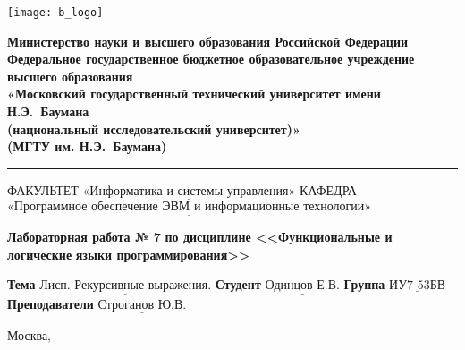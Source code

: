 \thispagestyle{empty}

\noindent \begin{minipage}{0.15\textwidth}
	\texttt{[image: b\_logo]}
\end{minipage}
\noindent\begin{minipage}{0.85\textwidth}\centering
	\textbf{Министерство науки и высшего образования Российской Федерации}\\
	\textbf{Федеральное государственное бюджетное образовательное учреждение высшего образования}\\
	\textbf{«Московский государственный технический университет имени Н.Э.~Баумана}\\
	\textbf{(национальный исследовательский университет)»}\\
	\textbf{(МГТУ им. Н.Э.~Баумана)}
\end{minipage}

\noindent\rule{\linewidth}{3pt}
\newline\newline
\noindent ФАКУЛЬТЕТ $\underline{\text{«Информатика и системы управления»}}$ \newline\newline
\noindent КАФЕДРА $\underline{\text{«Программное обеспечение ЭВМ и информационные технологии»}}$

\vspace{1cm}

\begin{center}
	\noindent\begin{minipage}{1.3\textwidth}\centering
		\Large\textbf{  Лабораторная работа № 7}\newline
		\textbf{по дисциплине <<Функциональные и логические}\newline
		\textbf{языки программирования>>}\newline\newline
	\end{minipage}
\end{center}

\noindent\textbf{Тема} $\underline{\text{Лисп. Рекурсивные выражения.}}$\newline\newline
\noindent\textbf{Студент} $\underline{\text{Одинцов Е.В.}}$\newline\newline
\noindent\textbf{Группа} $\underline{\text{ИУ7-53БВ}}$\newline\newline
\noindent\textbf{Преподаватели} $\underline{\text{Строганов Ю.В.}}$\newline

\begin{center}
	\vfill
	Москва,~\the\year
\end{center}
\clearpage
